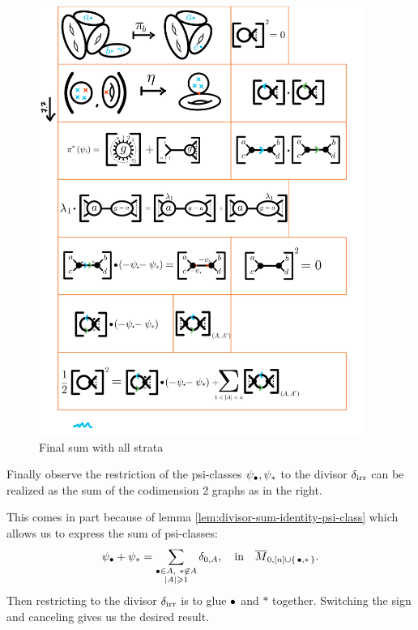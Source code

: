 \documentclass[12pt]{memoir}
\begin{document}
\begin{Ex}
     \begin{figure}[h!]
        \centering
        \includegraphics[width=0.95\textwidth, trim= 1.3cm 2.3cm 4.3cm 23.8cm,clip]{../figs/FigsDNnotability2.pdf}
        \caption{Final sum with all strata}
        \label{fig:irr-squared-5}
    \end{figure}
    Finally observe the restriction of the psi-classes $\psi_\bullet,\psi_\ast$ to the divisor $\delta_{\text{irr}}$ can be realized as the sum of the codimension 2 graphs as in the right.\par
    This comes in part because of lemma \ref{lem:divisor-sum-identity-psi-class} which allows us to express the sum of psi-classes:
    $$\psi_\8+\psi_\ast=\sum_{\substack{\8\in A,\ \ast\not\in A\\|A|\geq 1}}\dl_{0,A},\word{in}\ov{M}_{0,\bonj{n}\cup\set{\8,\ast}}.$$
    Then restricting to the divisor $\delta_{\text{irr}}$ is to glue $\bullet$ and $\ast$ together. Switching the sign and canceling gives us the desired result. 
\end{Ex}
\end{document}
